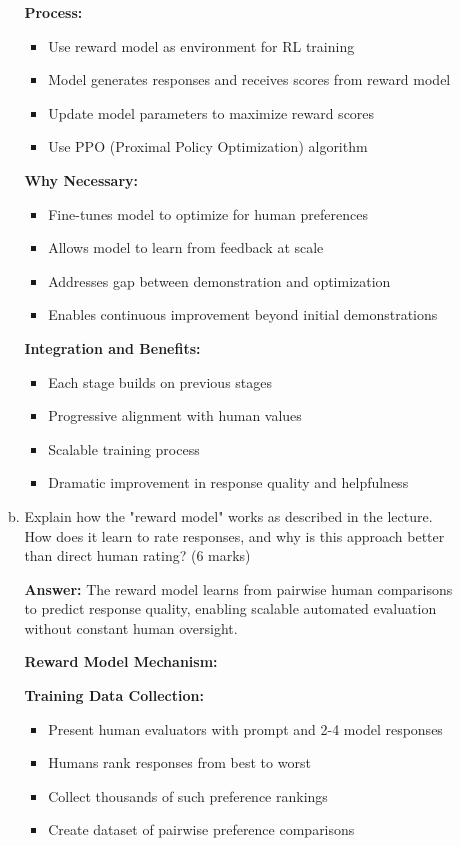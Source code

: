 \documentclass[12pt]{article}
\newcommand{\answer}[1]{{\color{answercolor}\textbf{Answer:} #1}}
\newcommand{\explanation}[1]{{\color{explanationcolor}#1}}
\begin{document}
\begin{enumerate}
\begin{enumerate}[(a)]
\begin{enumerate}[(a)]
{    \textbf{Process:}
    \begin{itemize}
        \item Use reward model as environment for RL training
        \item Model generates responses and receives scores from reward model
        \item Update model parameters to maximize reward scores
        \item Use PPO (Proximal Policy Optimization) algorithm
    \end{itemize}
    
    \textbf{Why Necessary:}
    \begin{itemize}
        \item Fine-tunes model to optimize for human preferences
        \item Allows model to learn from feedback at scale
        \item Addresses gap between demonstration and optimization
        \item Enables continuous improvement beyond initial demonstrations
    \end{itemize}
    
    \textbf{Integration and Benefits:}
    \begin{itemize}
        \item Each stage builds on previous stages
        \item Progressive alignment with human values
        \item Scalable training process
        \item Dramatic improvement in response quality and helpfulness
    \end{itemize}
    }
    
    \item Explain how the "reward model" works as described in the lecture. How does it learn to rate responses, and why is this approach better than direct human rating? \hfill (6 marks)
    
    \answer{The reward model learns from pairwise human comparisons to predict response quality, enabling scalable automated evaluation without constant human oversight.}
    
    \explanation{
    \textbf{Reward Model Mechanism:}
    
    \textbf{Training Data Collection:}
    \begin{itemize}
        \item Present human evaluators with prompt and 2-4 model responses
        \item Humans rank responses from best to worst
        \item Collect thousands of such preference rankings
        \item Create dataset of pairwise preference comparisons
    \end{itemize}
    
}
\end{enumerate}
\end{enumerate}
\end{enumerate}
\end{document}
